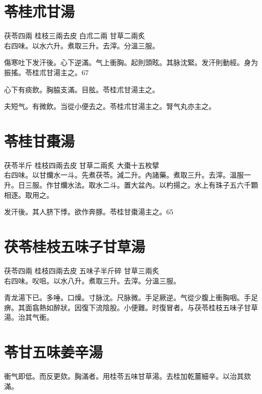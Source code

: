\documentclass[b5paper,twoside,zihao=-4,UTF8]{ctexbook}
\begin{document}
\section{苓桂朮甘湯}

茯苓{\scriptsize 四兩} 桂枝{\scriptsize 三兩去皮} 白朮{\scriptsize 二兩} 甘草{\scriptsize 二兩炙}\\
右四味。以水六升。煮取三升。去滓。分溫三服。

傷寒吐下发汗後。心下逆滿。气上衝胸。起則頭眩。其脉沈緊。发汗則動經。身为振搖。苓桂朮甘湯主之。67

心下有痰飲。胸脇支滿。目胘。苓桂朮甘湯主之。

夫短气。有微飲。当從小便去之。苓桂朮甘湯主之。腎气丸亦主之。

\section{苓桂甘棗湯}

茯苓{\scriptsize 半斤} 桂枝{\scriptsize 四兩去皮} 甘草{\scriptsize 二兩炙} 大棗{\scriptsize 十五枚擘}\\
右四味。以甘爤水一斗。先煮茯苓。減二升。內諸藥。煮取三升。去滓。溫服一升。日三服。作甘爤水法。取水二斗。置大盆內。以杓揚之。水上有珠子五六千顆相逐。取用之。

发汗後。其人脐下悸。欲作奔豚。苓桂甘棗湯主之。65

\section{茯苓桂枝五味子甘草湯}

茯苓{\scriptsize 四兩} 桂枝{\scriptsize 四兩去皮} 五味子{\scriptsize 半斤碎} 甘草{\scriptsize 三兩炙}\\
右四味。㕮咀。以水八升。煮取三升。去滓。分溫三服。

青龙湯下已。多唾。口燥。寸脉沈。尺脉微。手足厥逆。气從少腹上衝胸咽。手足痹。其面翕熱如醉狀。因復下流陰股。小便難。时復冒者。与茯苓桂枝五味子甘草湯。治其气衝。

\section{苓甘五味姜辛湯}

衝气即低。而反更欬。胸滿者。用桂苓五味甘草湯。去桂加乾薑細辛。以治其欬滿。

\section{}
\end{document}
